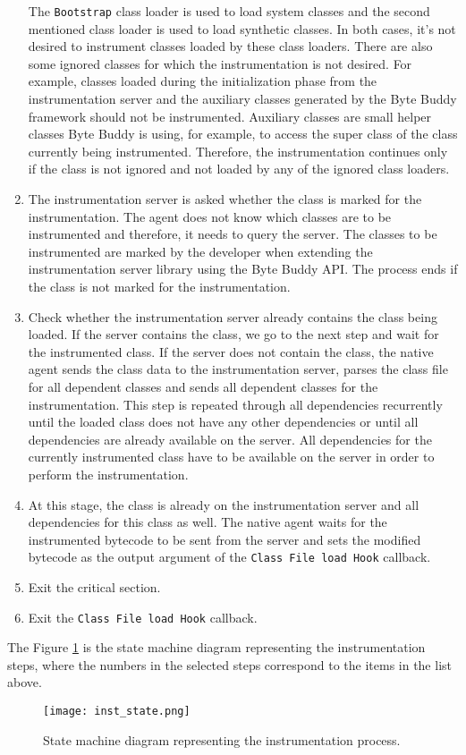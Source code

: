 \begin{enumerate}
	The \texttt{Bootstrap} class loader is used to load system classes and the second mentioned class loader is used to load synthetic classes. In both cases, it's not desired to instrument classes loaded by these class loaders.
	There are also some ignored classes for which the instrumentation is not desired. For example, classes loaded during the initialization phase from the instrumentation server and the auxiliary classes generated by the Byte Buddy framework should not be instrumented. Auxiliary classes are small helper classes Byte Buddy is using, for example, to access the super class of the class currently being instrumented. Therefore, the instrumentation continues only if the class is not ignored and not loaded by any of the ignored class loaders.
	
	\item The instrumentation server is asked whether the class is marked for the instrumentation. The agent does not know which classes are to be instrumented and therefore, it needs to query the server. The classes to be instrumented are marked by the developer when extending the instrumentation server library using the Byte Buddy API. The process ends if the class is not marked for the instrumentation.
	
	\item Check whether the instrumentation server already contains the class being loaded. If the server contains the class, we go to the next step and wait for the instrumented class. If the server does not contain the class, the native agent sends the class data to the instrumentation server, parses the class file for all dependent classes and sends all dependent classes for the instrumentation. This step is repeated through all dependencies recurrently until the loaded class does not have any other dependencies or until all dependencies are already available on the server. All dependencies for the currently instrumented class have to be available on the server in order to perform the instrumentation.

	\item At this stage, the class is already on the instrumentation server and all dependencies for this class as well. The native agent waits for the instrumented bytecode to be sent from the server and sets the modified bytecode as the output argument of the \texttt{Class File load Hook} callback.
	
	\item Exit the critical section.
	\item Exit the \texttt{Class File load Hook} callback.
\end{enumerate}
The Figure \ref{fig:inst_state} is the state machine diagram representing the instrumentation steps, where the numbers in the selected steps correspond to the items in the list above.
	\begin{figure}
		\centering
		\texttt{[image: inst\_state.png]}
		\caption{State machine diagram representing the instrumentation process.}
		\label{fig:inst_state}
	\end{figure}
	
